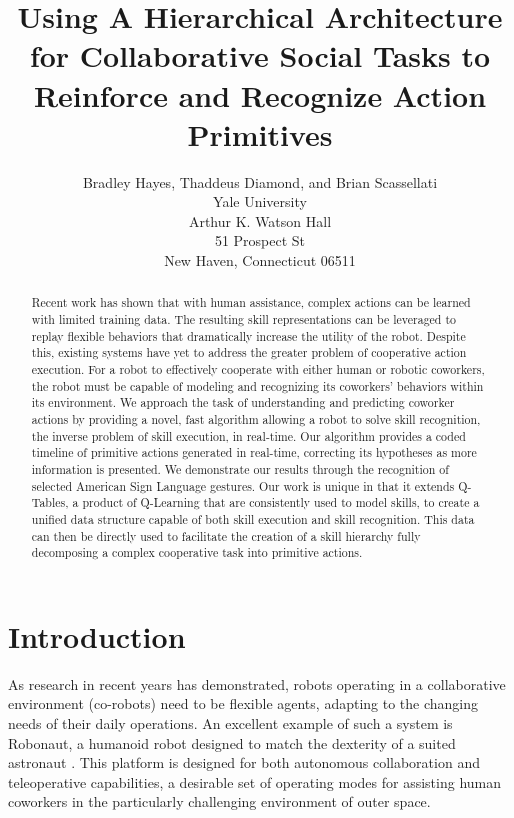 \documentclass[letterpaper]{article}
\begin{document}
\title{Using A Hierarchical Architecture for Collaborative Social Tasks to Reinforce and Recognize Action Primitives}
\author{Bradley Hayes, Thaddeus Diamond, and Brian Scassellati\\
Yale University\\
Arthur K. Watson Hall\\
51 Prospect St\\
New Haven, Connecticut 06511\\
}

\maketitle

\begin{abstract}
 Recent work has shown that with human
assistance, complex actions can be learned with limited training data. The
resulting skill representations can be leveraged to replay flexible behaviors
that dramatically increase the utility of the robot. Despite this, existing
systems have yet to address the greater problem of cooperative action execution.
For a robot to effectively cooperate with either human or robotic coworkers,
the robot must be capable of modeling and recognizing its
coworkers' behaviors within its environment. We approach the task of
understanding and predicting coworker actions by providing a novel, fast algorithm
allowing a robot to solve skill recognition, the inverse problem of skill execution,
in real-time. Our algorithm provides a coded timeline of
primitive actions generated in real-time, correcting its hypotheses as more
information is presented. We demonstrate our results through the recognition of selected
American Sign Language gestures. Our work is unique in that it extends Q-Tables,
a product of Q-Learning that are consistently used to model skills,
to create a unified data structure capable of both skill execution
and skill recognition.  This data can then be directly used to facilitate the
creation of a skill hierarchy fully decomposing a complex cooperative 
task into primitive actions.
\end{abstract}

\section{Introduction}
\label{sec:intro}
	As research in recent years has demonstrated, robots operating in a collaborative environment (co-robots) need to be flexible agents, adapting to the changing needs of their daily operations. An excellent example of such a system is Robonaut, a humanoid robot designed to match the dexterity of a suited astronaut \cite{Robonaut}. This platform is designed for both autonomous collaboration and teleoperative capabilities, a desirable set of operating modes for assisting human coworkers in the particularly challenging environment of outer space.
	
\end{document}
